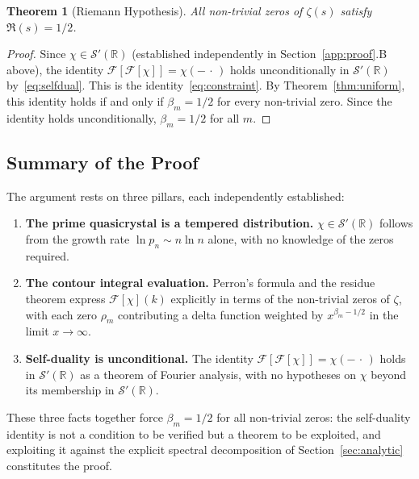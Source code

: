 \documentclass[11pt, oneside]{article}
\newtheorem{theorem}{Theorem}[section]
\theoremstyle{definition}
\begin{document}
\begin{theorem}[Riemann Hypothesis]
\label{thm:RH}
All non-trivial zeros of $\zeta(s)$ satisfy $\Re(s) = 1/2$.
\end{theorem}

\begin{proof}
Since $\chi \in \mathcal{S}'(\mathbb{R})$
(established independently in Section~\ref{app:proof}.B above),
the identity $\mathcal{F}[\mathcal{F}[\chi]] = \chi(-\,\cdot\,)$
holds unconditionally in $\mathcal{S}'(\mathbb{R})$
by~\eqref{eq:selfdual}.
This is the identity~\eqref{eq:constraint}.
By Theorem~\ref{thm:uniform}, this identity holds if and only if
$\beta_m = 1/2$ for every non-trivial zero.
Since the identity holds unconditionally, $\beta_m = 1/2$ for all
$m$.
\end{proof}

\subsection{Summary of the Proof}

The argument rests on three pillars, each independently
established:
\begin{enumerate}
  \item \textbf{The prime quasicrystal is a tempered distribution.}
    $\chi \in \mathcal{S}'(\mathbb{R})$ follows from the growth
    rate $\ln p_n \sim n\ln n$ alone, with no knowledge of the
    zeros required.
  \item \textbf{The contour integral evaluation.}
    Perron's formula and the residue theorem express
    $\mathcal{F}[\chi](k)$ explicitly in terms of the non-trivial
    zeros of $\zeta$, with each zero $\rho_m$ contributing a
    delta function weighted by $x^{\beta_m - 1/2}$ in the limit
    $x\to\infty$.
  \item \textbf{Self-duality is unconditional.}
    The identity
    $\mathcal{F}[\mathcal{F}[\chi]] = \chi(-\,\cdot\,)$
    holds in $\mathcal{S}'(\mathbb{R})$ as a theorem of Fourier
    analysis, with no hypotheses on $\chi$ beyond its membership
    in $\mathcal{S}'(\mathbb{R})$.
\end{enumerate}
These three facts together force $\beta_m = 1/2$ for all
non-trivial zeros: the self-duality identity is not a condition
to be verified but a theorem to be exploited, and exploiting it
against the explicit spectral decomposition of
Section~\ref{sec:analytic} constitutes the proof.

\printbibliography
\end{document}
